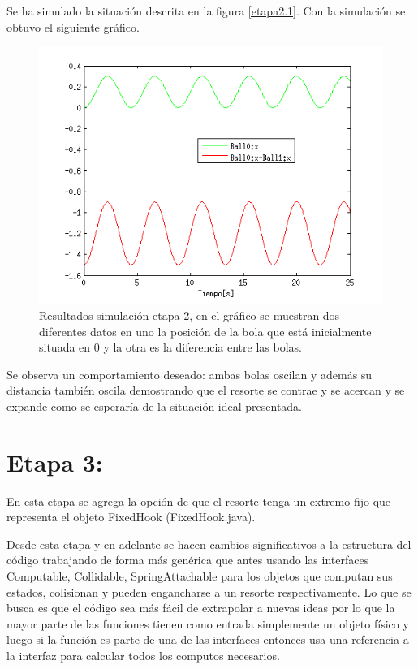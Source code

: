 \documentclass[a4paper,10pt]{article}
\begin{document}
Se ha simulado la situación descrita en la figura \ref{etapa2.1}. Con la simulación se obtuvo el siguiente gráfico.

\begin{figure}[H]
 \centering
 \includegraphics[scale=0.5]{./simulacion_etapa2.png}
 \caption{Resultados simulación etapa 2, en el gráfico se muestran dos diferentes datos en uno la posición de la bola que está inicialmente
 situada en 0 y la otra es la diferencia entre las bolas.}
  \label{etapa2.2}
\end{figure}

  Se observa un comportamiento deseado: ambas bolas oscilan y además su distancia también oscila demostrando que el resorte se contrae y 
  se acercan  y se expande como se esperaría de la situación ideal presentada.\newline
  
\section{Etapa 3:}
 
 En esta etapa se agrega la opción de que el resorte tenga un extremo fijo que representa el objeto FixedHook (FixedHook.java).\newline
 
 
 Desde esta etapa y en adelante se hacen cambios significativos a la estructura del código trabajando de forma más genérica que antes
 usando las interfaces Computable, Collidable, SpringAttachable para los objetos que computan sus estados, colisionan y pueden engancharse
 a un resorte respectivamente. Lo que se busca es que el código sea más fácil de extrapolar a nuevas ideas por lo que la mayor parte de
 las funciones tienen como entrada simplemente un objeto físico y luego si la función es parte de una de las interfaces entonces usa una 
 referencia a la interfaz para calcular todos los computos necesarios.\newline
 
\end{document}

